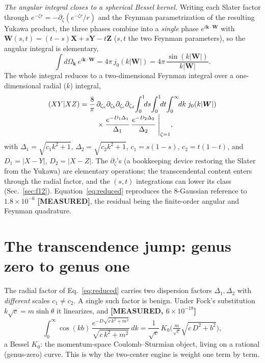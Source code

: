 \documentclass[aps,pra,twocolumn,superscriptaddress,longbibliography]{revtex4-2}
\begin{document}
\emph{The angular integral closes to a spherical Bessel kernel.}  Writing
each Slater factor through $e^{-\zeta r}=-\partial_{\zeta}(e^{-\zeta r}/r)$
and the Feynman parametrization of the resulting Yukawa product, the three
phases combine into a \emph{single} phase $e^{i\bm k\cdot\bm W}$ with
$\bm W(s,t)=(t-s)\bm X+s\bm Y-t\bm Z$ ($s,t$ the two Feynman parameters), so
the angular integral is elementary,
%
\begin{equation}
  \int d\Omega_{\bm k}\, e^{i\bm k\cdot\bm W}
  = 4\pi\, j_{0}(k|\bm W|)
  = 4\pi\,\frac{\sin(k|\bm W|)}{k|\bm W|}.
  \label{eq:angular}
\end{equation}
%
The whole integral reduces to a two-dimensional Feynman integral over a
one-dimensional radial ($k$) integral,
%
\begin{align}
  (XY|XZ) = \frac{8}{\pi}\,
  &\partial_{\zeta_{a}}\partial_{\zeta_{b}}
   \partial_{\zeta_{c}}\partial_{\zeta_{d}}
   \!\int_{0}^{1}\!\!ds\!\int_{0}^{1}\!\!dt\!\int_{0}^{\infty}\!\!dk\;
   j_{0}(k|\bm W|)\notag\\[-2pt]
  &\times\frac{e^{-D_{1}\Delta_{1}}}{\Delta_{1}}\,
          \frac{e^{-D_{2}\Delta_{2}}}{\Delta_{2}}
  \;\Bigg|_{\zeta=1},
  \label{eq:reduced}
\end{align}
%
with $\Delta_{1}=\sqrt{c_{1}k^{2}+1}$, $\Delta_{2}=\sqrt{c_{2}k^{2}+1}$,
$c_{1}=s(1-s)$, $c_{2}=t(1-t)$, and $D_{1}=|X-Y|$, $D_{2}=|X-Z|$.  The
$\partial_{\zeta}$'s (a bookkeeping device restoring the Slater from the
Yukawa) are elementary operations; the
transcendental content enters through the radial factor, and the $(s,t)$
integrations can lower its class (Sec.~\ref{sec:f12}).
Equation~\eqref{eq:reduced} reproduces the $8$-Gaussian reference to
$1.8\times10^{-6}$ \textbf{[MEASURED]}, the residual being the finite-order
angular and Feynman quadrature.

\section{The transcendence jump: genus zero to genus one}
\label{sec:genus}

The radial factor of Eq.~\eqref{eq:reduced} carries two dispersion factors
$\Delta_{1},\Delta_{2}$ with \emph{different} scales $c_{1}\neq c_{2}$.  A
single such factor is benign.  Under Fock's substitution
$k\sqrt{c}=m\sinh\theta$ it linearizes, and \textbf{[MEASURED, $6\times
10^{-18}$]}
%
\begin{equation}
  \int_{0}^{\infty}\!\!\cos(kb)\,
  \frac{e^{-D\sqrt{c\,k^{2}+m^{2}}}}{\sqrt{c\,k^{2}+m^{2}}}\,dk
  = \frac{1}{\sqrt{c}}\,
    K_{0}\!\Big(\tfrac{m}{\sqrt{c}}\sqrt{c\,D^{2}+b^{2}}\Big),
  \label{eq:K0}
\end{equation}
%
a Bessel $K_{0}$: the momentum-space Coulomb--Sturmian object, living on a
rational (genus-zero) curve.  This is why the two-center engine is weight one term by term.
\end{document}
